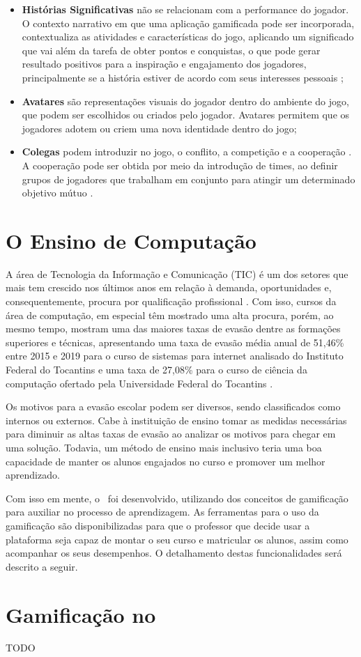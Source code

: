 \begin{itemize}
    \item \textbf{Histórias Significativas} não se relacionam com a performance do jogador. O contexto narrativo em que uma aplicação gamificada pode ser incorporada, contextualiza as atividades e características do jogo, aplicando um significado que vai além da tarefa de obter pontos e conquistas, o que pode gerar resultado positivos para a inspiração e engajamento dos jogadores, principalmente se a história estiver de acordo com seus interesses pessoais \cite{meaningful-gamification};
    \item \textbf{Avatares} são representações visuais do jogador dentro do ambiente do jogo, que podem ser escolhidos ou criados pelo jogador. Avatares permitem que os jogadores adotem ou criem uma nova identidade dentro do jogo;
    \item \textbf{Colegas} podem introduzir no jogo, o conflito, a competição e a cooperação \cite{kapp_gamification}. A cooperação pode ser obtida por meio da introdução de times, ao definir grupos de jogadores que trabalham em conjunto para atingir um determinado objetivo mútuo \cite{ranking_motivation}.
\end{itemize}

\section{O Ensino de Computação}

A área de Tecnologia da Informação e Comunicação (TIC) é um dos setores que mais tem crescido nos últimos anos em relação à demanda, oportunidades e, consequentemente, procura por qualificação profissional \cite{brasscom-tic}. Com isso, cursos da área de computação, em especial têm mostrado uma alta procura, porém, ao mesmo tempo, mostram uma das maiores taxas de evasão dentre as formações superiores e técnicas, apresentando uma taxa de evasão média anual de 51,46\% entre 2015 e 2019 para o curso de sistemas para internet analisado do Instituto Federal do Tocantins e uma taxa de 27,08\% para o curso de ciência da computação ofertado pela Universidade Federal do Tocantins \cite{evasao-computacao}.

Os motivos para a evasão escolar podem ser diversos, sendo classificados como internos ou externos. Cabe à instituição de ensino tomar as medidas necessárias para diminuir as altas taxas de evasão ao analizar os motivos para chegar em uma solução. Todavia, um método de ensino mais inclusivo teria uma boa capacidade de manter os alunos engajados no curso e promover um melhor aprendizado.

Com isso em mente, o \appName\ foi desenvolvido, utilizando dos conceitos de gamificação para auxiliar no processo de aprendizagem. As ferramentas para o uso da gamificação são disponibilizadas para que o professor que decide usar a plataforma seja capaz de montar o seu curso e matricular os alunos, assim como acompanhar os seus desempenhos. O detalhamento destas funcionalidades será descrito a seguir.

\section{Gamificação no \appName}

TODO
